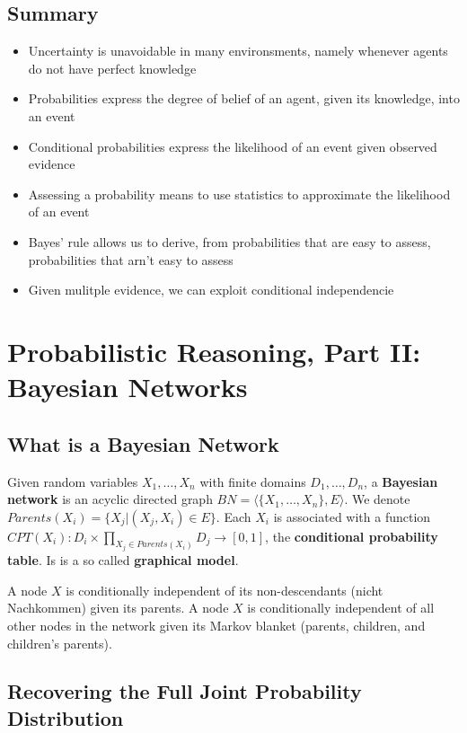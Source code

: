 \documentclass{scrartcl}
\begin{document}
\subsection{Summary}
\begin{itemize}
    \item
        Uncertainty is unavoidable in many environsments, namely whenever agents do not have perfect knowledge
    \item
        Probabilities express the degree of belief of an agent, given its knowledge, into an event
    \item
        Conditional probabilities express the likelihood of an event given observed evidence
    \item
        Assessing a probability means to use statistics to approximate the likelihood of an event
    \item
        Bayes' rule allows us to derive, from probabilities that are easy to assess, probabilities that arn't easy to assess
    \item
        Given mulitple evidence, we can exploit conditional independencie
\end{itemize}

\section{Probabilistic Reasoning, Part II: Bayesian Networks}
\subsection{What is a Bayesian Network}
Given random variables \(X_1, \dots, X_n\) with finite domains \(D_1, \dots, D_n\), a \textbf{Bayesian network} is an acyclic directed graph \(BN = \langle \{X_1, \dots, X_n\}, E\rangle\). We denote \(Parents(X_i) = \{X_j | (X_j, X_i) \in E \}\). Each \(X_i\) is associated with a function \(CPT(X_i): D_i \times \prod_{X_j \in Parents(X_i)} D_j \rightarrow [0,1]\), the \textbf{conditional probability table}. Is is a so called \textbf{graphical model}.

A node \(X\) is conditionally independent of its non-descendants (nicht Nachkommen) given its parents. A node \(X\) is conditionally independent of all other nodes in the network given its Markov blanket (parents, children, and children's parents).

\subsection{Recovering the Full Joint Probability Distribution}
\end{document}
